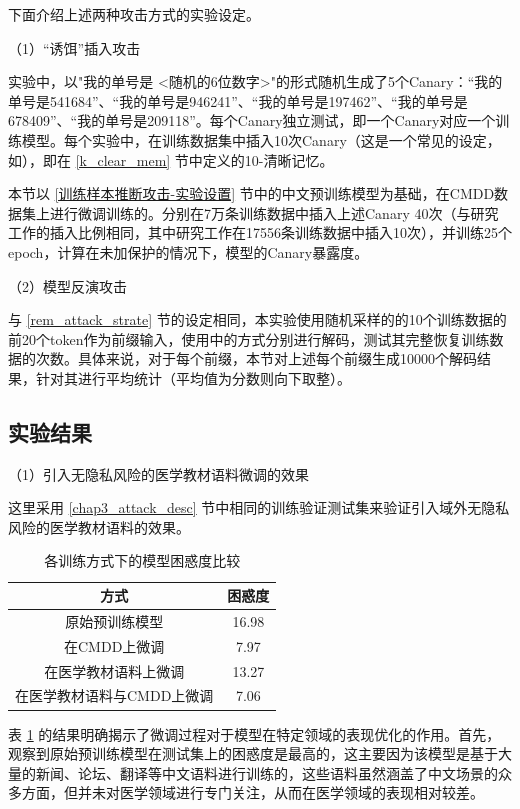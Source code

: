 下面介绍上述两种攻击方式的实验设定。

（1）“诱饵”插入攻击

实验中，以"我的单号是 <随机的6位数字>"的形式随机生成了5个Canary：“我的单号是541684”、“我的单号是946241”、“我的单号是197462”、“我的单号是678409”、“我的单号是209118”。每个Canary独立测试，即一个Canary对应一个训练模型。每个实验中，在训练数据集中插入10次Canary（这是一个常见的设定，如\cite{selectivedp}），即在 \ref{k_clear_mem} 节中定义的10-清晰记忆。

本节以 \ref{训练样本推断攻击-实验设置} 节中的中文预训练模型为基础，在CMDD数据集上进行微调训练的。分别在7万条训练数据中插入上述Canary 40次（与研究工作\cite{selectivedp}的插入比例相同，其中研究工作\cite{selectivedp}在17556条训练数据中插入10次），并训练25个epoch，计算在未加保护的情况下，模型的Canary暴露度。


（2）模型反演攻击

与 \ref{rem_attack_strate} 节的设定相同，本实验使用随机采样的的10个训练数据的前20个token作为前缀输入，使用中的方式分别进行解码，测试其完整恢复训练数据的次数。具体来说，对于每个前缀，本节对上述每个前缀生成10000个解码结果，针对其进行平均统计（平均值为分数则向下取整）。

\subsection{实验结果}

（1）引入无隐私风险的医学教材语料微调的效果

这里采用 \ref{chap3_attack_desc} 节中相同的训练验证测试集来验证引入域外无隐私风险的医学教材语料的效果。

\begin{table}[]
	\centering
	\caption{各训练方式下的模型困惑度比较}
	\begin{tabular}{|c|c|}
		\hline
		方式&困惑度   \\ \hline
		原始预训练模型&16.98    \\ \hline
		在CMDD上微调&7.97    \\ \hline
		在医学教材语料上微调&13.27    \\ \hline
		在医学教材语料与CMDD上微调&7.06   \\ \hline
	\end{tabular}
	\label{Chap5_MedExpand_Performance}
\end{table}

表 \ref{Chap5_MedExpand_Performance} 的结果明确揭示了微调过程对于模型在特定领域的表现优化的作用。首先，观察到原始预训练模型在测试集上的困惑度是最高的，这主要因为该模型是基于大量的新闻、论坛、翻译等中文语料进行训练的，这些语料虽然涵盖了中文场景的众多方面，但并未对医学领域进行专门关注，从而在医学领域的表现相对较差。

